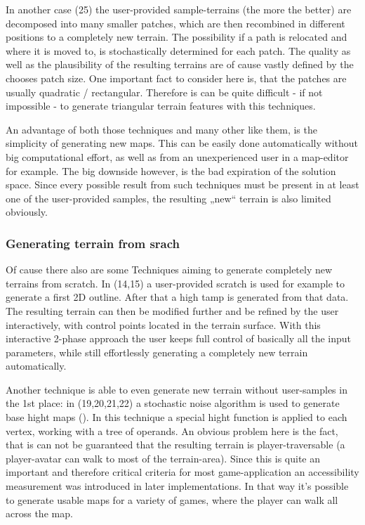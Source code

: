 In another case (25) the user-provided sample-terrains (the more the better) are decomposed into many smaller patches, which are then recombined in different positions to a completely new terrain. The possibility if a path is relocated and where it is moved to, is stochastically determined for each patch. The quality as well as the plausibility of the resulting terrains are of cause vastly defined by the chooses patch size. One important fact to consider here is, that the patches are usually quadratic / rectangular. Therefore is can be quite difficult - if not impossible - to generate triangular terrain features with this techniques.

An advantage of both those techniques and many other like them, is the simplicity of generating new maps. This can be easily done automatically without big computational effort, as well as from an unexperienced user in a map-editor for example. The big downside however, is the bad expiration of the solution space. Since every possible result from such techniques must be present in at least one of the user-provided samples, the resulting „new“ terrain is also limited obviously.

\subsubsection{Generating terrain from srach}
Of cause there also are some Techniques aiming to generate completely new terrains from scratch. In (14,15) a user-provided scratch is used for example to generate a first 2D outline. After that a high tamp is generated from that data. The resulting terrain can then be modified further and be refined by the user interactively, with control points located in the terrain surface. With this interactive 2-phase approach the user keeps full control of basically all the input parameters, while still effortlessly generating a completely new terrain automatically.

Another technique is able to even generate new terrain without user-samples in the 1st place: in (19,20,21,22) a stochastic noise algorithm is used to generate base hight maps (). In this technique a special hight function is applied to each vertex, working with a tree of operands. An obvious problem here is the fact, that is can not be guaranteed that the resulting terrain is player-traversable (a player-avatar can walk to most of the terrain-area). Since this is quite an important and therefore critical criteria for most game-application an accessibility measurement was introduced in later implementations. In that way it’s possible to generate usable maps for a variety of games, where the player can walk all across the map.

